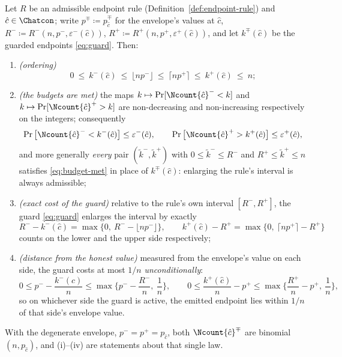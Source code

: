 \begin{lemma}\label{lem:guard}
Let $R$ be an admissible endpoint rule (Definition~\ref{def:endpoint-rule})
and $\hat c\in\Chatcon$; write $p^{\mp}\coloneqq p^{\mp}_{\hat c}$ for the
envelope's values at $\hat c$,
$R^{-}\coloneqq R^{-}(n,p^{-},\varepsilon^{-}(\hat c))$,
$R^{+}\coloneqq R^{+}(n,p^{+},\varepsilon^{+}(\hat c))$, and let
$k^{\mp}(\hat c)$ be the guarded endpoints \eqref{eq:guard}. Then:
\begin{enumerate}[label=(\roman*),leftmargin=2.2em]
\item \emph{(ordering)}
\begin{equation}\label{eq:ordering}
  0\ \le\ k^{-}(\hat c)\ \le\ \lfloor n p^{-}\rfloor
  \ \le\ \lceil n p^{+}\rceil\ \le\ k^{+}(\hat c)\ \le\ n ;
\end{equation}
\item \emph{(the budgets are met)} the maps $k\mapsto\Pr[\Ncount{\hat c}^{-}<k]$
and $k\mapsto\Pr[\Ncount{\hat c}^{+}>k]$ are non-decreasing and non-increasing
respectively on the integers; consequently
\begin{equation}\label{eq:budget-met}
  \Pr\big[\Ncount{\hat c}^{-}<k^{-}(\hat c)\big]\le\varepsilon^{-}(\hat c),
  \qquad
  \Pr\big[\Ncount{\hat c}^{+}>k^{+}(\hat c)\big]\le\varepsilon^{+}(\hat c),
\end{equation}
and more generally \emph{every} pair $(\tilde k^{-},\tilde k^{+})$ with
$0\le\tilde k^{-}\le R^{-}$ and $R^{+}\le\tilde k^{+}\le n$ satisfies
\eqref{eq:budget-met} in place of $k^{\mp}(\hat c)$: enlarging the rule's
interval is always admissible;
\item \emph{(exact cost of the guard)} relative to the rule's own interval
$[R^{-},R^{+}]$, the guard \eqref{eq:guard} enlarges the interval by exactly
\begin{equation}\label{eq:guard-cost}
  R^{-}-k^{-}(\hat c)
    =\max\big\{0,\ R^{-}-\lfloor np^{-}\rfloor\big\},
  \qquad
  k^{+}(\hat c)-R^{+}
    =\max\big\{0,\ \lceil np^{+}\rceil-R^{+}\big\}
\end{equation}
counts on the lower and the upper side respectively;
\item \emph{(distance from the honest value)} measured from the envelope's
value on each side, the guard costs at most $1/n$ \emph{unconditionally}:
\begin{equation}\label{eq:guard-from-p}
  0\le p^{-}-\frac{k^{-}(\hat c)}{n}
    \le\max\Big\{p^{-}-\frac{R^{-}}{n},\ \frac1n\Big\},
  \qquad
  0\le \frac{k^{+}(\hat c)}{n}-p^{+}
    \le\max\Big\{\frac{R^{+}}{n}-p^{+},\ \frac1n\Big\},
\end{equation}
so on whichever side the guard is active, the emitted endpoint lies within
$1/n$ of that side's envelope value.
\end{enumerate}
With the degenerate envelope, $p^{-}=p^{+}=p_{\hat c}$, both
$\Ncount{\hat c}^{\mp}$ are binomial $(n,p_{\hat c})$, and (i)--(iv) are
statements about that single law.
\end{lemma}

